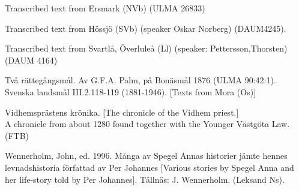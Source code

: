
\item 

\label{bkm:Ref137880753}Transcribed text from Ersmark (NVb) (ULMA 26833) 


\item 

\label{bkm:Ref137882624}Transcribed text from Hössjö (SVb) (speaker Oskar Norberg) (DAUM4245).


\item 

\label{bkm:Ref137880773}Transcribed text from Svartlå, Överluleå (Ll) (speaker: Pettersson,Thorsten) (DAUM 4164)


\item 

\label{bkm:Ref154203986}Två rättegångsmål. Av G.F.A. Palm, på Bonäsmål 1876 (ULMA 90:42:1). Svenska landsmål III.2.118-119 (1881-1946). [Texts from Mora (Os)]

\item 

\label{bkm:Ref137879614}\label{bkm:Ref261512115}Vidhemsprästens krönika. [The chronicle of the Vidhem priest.]\\
A chronicle from about 1280 found together with the Younger Västgöta Law. (FTB) 

\item 

\label{bkm:Ref150067493}\label{bkm:Ref150327539}Wennerholm, John, ed. 1996. Många av Spegel Annas historier jämte hennes levnadshistoria författad av Per Johannes [Various stories by Spegel Anna and her life-story told by Per Johannes]. Tällnäs: J. Wennerholm. (Leksand Ns). 

